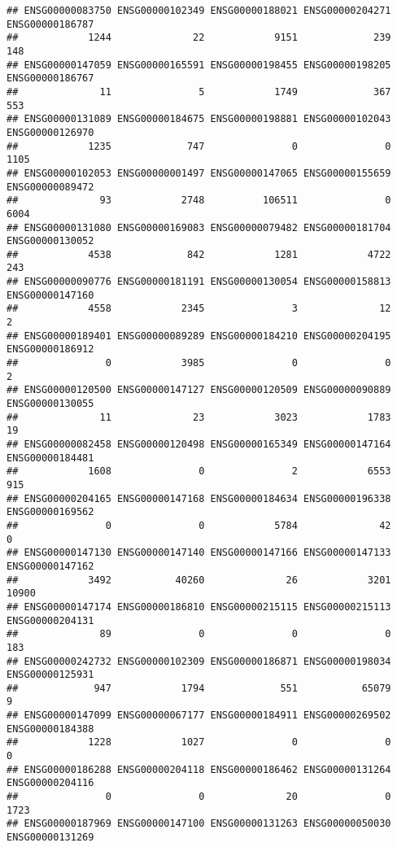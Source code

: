 \documentclass[
]{article}
\begin{document}
\begin{verbatim}
## ENSG00000083750 ENSG00000102349 ENSG00000188021 ENSG00000204271 ENSG00000186787 
##            1244              22            9151             239             148 
## ENSG00000147059 ENSG00000165591 ENSG00000198455 ENSG00000198205 ENSG00000186767 
##              11               5            1749             367             553 
## ENSG00000131089 ENSG00000184675 ENSG00000198881 ENSG00000102043 ENSG00000126970 
##            1235             747               0               0            1105 
## ENSG00000102053 ENSG00000001497 ENSG00000147065 ENSG00000155659 ENSG00000089472 
##              93            2748          106511               0            6004 
## ENSG00000131080 ENSG00000169083 ENSG00000079482 ENSG00000181704 ENSG00000130052 
##            4538             842            1281            4722             243 
## ENSG00000090776 ENSG00000181191 ENSG00000130054 ENSG00000158813 ENSG00000147160 
##            4558            2345               3              12               2 
## ENSG00000189401 ENSG00000089289 ENSG00000184210 ENSG00000204195 ENSG00000186912 
##               0            3985               0               0               2 
## ENSG00000120500 ENSG00000147127 ENSG00000120509 ENSG00000090889 ENSG00000130055 
##              11              23            3023            1783              19 
## ENSG00000082458 ENSG00000120498 ENSG00000165349 ENSG00000147164 ENSG00000184481 
##            1608               0               2            6553             915 
## ENSG00000204165 ENSG00000147168 ENSG00000184634 ENSG00000196338 ENSG00000169562 
##               0               0            5784              42               0 
## ENSG00000147130 ENSG00000147140 ENSG00000147166 ENSG00000147133 ENSG00000147162 
##            3492           40260              26            3201           10900 
## ENSG00000147174 ENSG00000186810 ENSG00000215115 ENSG00000215113 ENSG00000204131 
##              89               0               0               0             183 
## ENSG00000242732 ENSG00000102309 ENSG00000186871 ENSG00000198034 ENSG00000125931 
##             947            1794             551           65079               9 
## ENSG00000147099 ENSG00000067177 ENSG00000184911 ENSG00000269502 ENSG00000184388 
##            1228            1027               0               0               0 
## ENSG00000186288 ENSG00000204118 ENSG00000186462 ENSG00000131264 ENSG00000204116 
##               0               0              20               0            1723 
## ENSG00000187969 ENSG00000147100 ENSG00000131263 ENSG00000050030 ENSG00000131269 

\end{verbatim}
\end{document}
